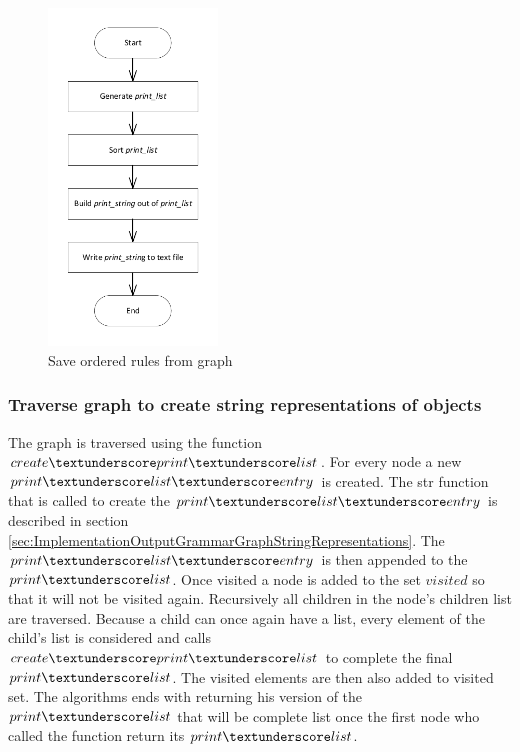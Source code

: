 \begin{figure}[H]
\centering
\includegraphics[width=0.4\textwidth]{images/Implementation_saveorderedrules.pdf}
\caption{Save ordered rules from graph}
\label{fig:ImplementationOutputSaveOrderedRules}
\end{figure}

\subsubsection{Traverse graph to create string representations of objects}\label{sec:ImpolementationOutputGrammarGraphTraverse}

The graph is traversed using the function $create\textunderscore print\textunderscore list$. For every node a new $print\textunderscore list\textunderscore entry$ is created. The str function that is called to create the $print\textunderscore list\textunderscore entry$ is described in section \ref{sec:ImplementationOutputGrammarGraphStringRepresentations}. 
The $print\textunderscore list\textunderscore entry$ is then appended to the $print\textunderscore list$. Once visited a node is added to the set $visited$ so that it will not be visited again.
Recursively all children in the node's children list are traversed. Because a child can once again have a list, every element of the child's list is considered and calls $create\textunderscore print\textunderscore list$ to complete the final $print\textunderscore list$. The visited elements are then also added to visited set. The algorithms ends with returning his version of the $print\textunderscore list$ that will be complete list once the first node who called the function return its $print\textunderscore list$.

